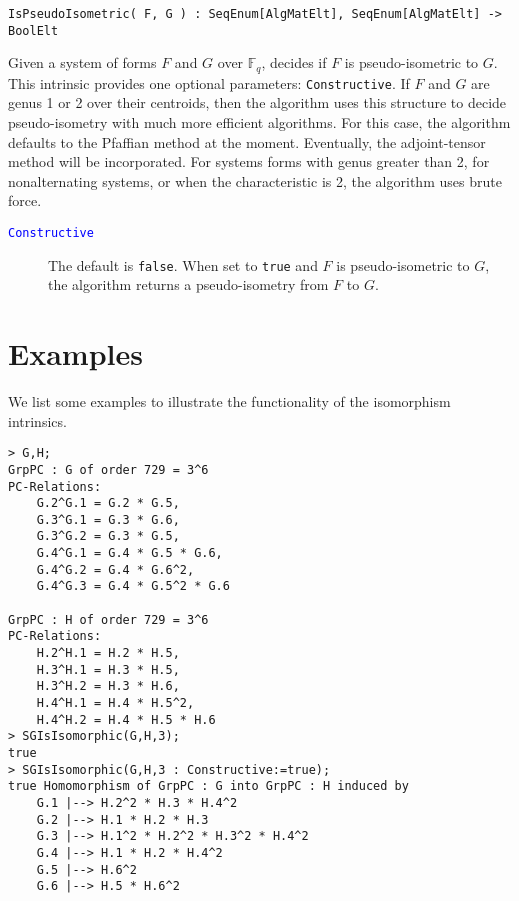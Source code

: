 \documentclass{documentation}
\begin{document}
\color{blue}
\begin{verbatim}
IsPseudoIsometric( F, G ) : SeqEnum[AlgMatElt], SeqEnum[AlgMatElt] -> BoolElt
\end{verbatim}

\color{black}
Given a system of forms $F$ and $G$ over $\mathbb{F}_q$, decides if $F$ is pseudo-isometric to $G$.
This intrinsic provides one optional parameters: {\tt Constructive}. 
If $F$ and $G$ are genus 1 or 2 over their centroids, then the algorithm uses this structure to decide pseudo-isometry with much more efficient algorithms.
For this case, the algorithm defaults to the Pfaffian method at the moment. 
Eventually, the adjoint-tensor method will be incorporated.
For systems forms with genus greater than 2, for nonalternating systems, or when the characteristic is 2, the algorithm uses brute force. 

\begin{description}
\item[\textcolor{blue}{\tt Constructive}]
The default is {\tt false}. 
When set to {\tt true} and $F$ is pseudo-isometric to $G$, the algorithm returns a pseudo-isometry from $F$ to $G$.
\end{description}


\section{Examples}
We list some examples to illustrate the functionality of the isomorphism intrinsics.

\begin{lstlisting}[frame=single,basicstyle=\ttfamily\color{black!30!teal},backgroundcolor=\color{white!70!gray}]
> G,H;
GrpPC : G of order 729 = 3^6
PC-Relations:
    G.2^G.1 = G.2 * G.5, 
    G.3^G.1 = G.3 * G.6, 
    G.3^G.2 = G.3 * G.5, 
    G.4^G.1 = G.4 * G.5 * G.6, 
    G.4^G.2 = G.4 * G.6^2, 
    G.4^G.3 = G.4 * G.5^2 * G.6

GrpPC : H of order 729 = 3^6
PC-Relations:
    H.2^H.1 = H.2 * H.5, 
    H.3^H.1 = H.3 * H.5, 
    H.3^H.2 = H.3 * H.6, 
    H.4^H.1 = H.4 * H.5^2, 
    H.4^H.2 = H.4 * H.5 * H.6
> SGIsIsomorphic(G,H,3);
true
> SGIsIsomorphic(G,H,3 : Constructive:=true);
true Homomorphism of GrpPC : G into GrpPC : H induced by
    G.1 |--> H.2^2 * H.3 * H.4^2
    G.2 |--> H.1 * H.2 * H.3
    G.3 |--> H.1^2 * H.2^2 * H.3^2 * H.4^2
    G.4 |--> H.1 * H.2 * H.4^2
    G.5 |--> H.6^2
    G.6 |--> H.5 * H.6^2
\end{lstlisting}
\end{document}
